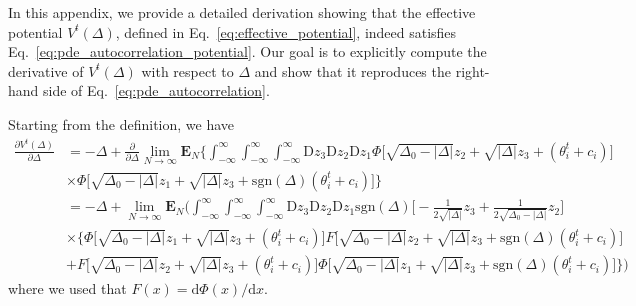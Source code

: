 \documentclass[reprint,amsmath,amssymb,aps]{revtex4-2}
\begin{document}
In this appendix, we provide a detailed derivation showing that the effective potential $V^t(\Delta)$, defined in Eq.~\eqref{eq:effective_potential}, indeed satisfies Eq.~\eqref{eq:pde_autocorrelation_potential}.  
Our goal is to explicitly compute the derivative of $V^t(\Delta)$ with respect to $\Delta$ and show that it reproduces the right-hand side of Eq.~\eqref{eq:pde_autocorrelation}.

Starting from the definition, we have
\begin{align}
    \frac{\partial V^t(\Delta)}{\partial \Delta}
    &=
    -\Delta+ 
    \frac{\partial}{\partial \Delta}
    \lim_{N\to\infty} \mathbf{E}_{N} \Bigg\{
    \int_{-\infty}^{\infty}
    \int_{-\infty}^{\infty}
    \int_{-\infty}^{\infty}
    \mathrm{D}z_3
    \mathrm{D}z_2
    \mathrm{D}z_1
    \Phi\Big[ \sqrt{\Delta_0 - |\Delta|} z_2 + \sqrt{|\Delta|}z_3 + (\theta_i^t + c_i)\Big]
    \nonumber
    \\
    &\times
    \Phi\Big[ \sqrt{\Delta_0 - |\Delta|} z_1 + \sqrt{|\Delta|}z_3 + \mathrm{sgn}(\Delta) (\theta_i^t + c_i)\Big]\Bigg\}
    \nonumber
    \\
    &=
    -\Delta+ 
    \lim_{N\to\infty} \mathbf{E}_{N} \Bigg(
    \int_{-\infty}^{\infty}
    \int_{-\infty}^{\infty}
    \int_{-\infty}^{\infty}
    \mathrm{D}z_3
    \mathrm{D}z_2
    \mathrm{D}z_1
    \mathrm{sgn}(\Delta)
    \Bigg[
    -\frac{1}{2 \sqrt{|\Delta|}} z_3
    +
    \frac{1}{2 \sqrt{\Delta_0-|\Delta|}} z_2
    \Bigg]
    \\
    &\times
    \Bigg\{
    \Phi\Big[ \sqrt{\Delta_0 - |\Delta|} z_1 + \sqrt{|\Delta|}z_3 + (\theta_i^t + c_i)\Big]
    F\Big[ \sqrt{\Delta_0 - |\Delta|} z_2 + \sqrt{|\Delta|}z_3 + \mathrm{sgn}(\Delta) (\theta_i^t + c_i)\Big]
    \nonumber
    \\
    &+
    F\Big[ \sqrt{\Delta_0 - |\Delta|} z_2 + \sqrt{|\Delta|}z_3 + (\theta_i^t + c_i)\Big]
    \Phi\Big[ \sqrt{\Delta_0 - |\Delta|} z_1 + \sqrt{|\Delta|}z_3 + \mathrm{sgn}(\Delta) (\theta_i^t + c_i)\Big]
    \Bigg\}
    \Bigg)
    \label{eq:Vt_indicator}
\end{align}
where we used that $F(x) = \mathrm{d}\Phi(x)/\mathrm{d}x$.  
\end{document}
